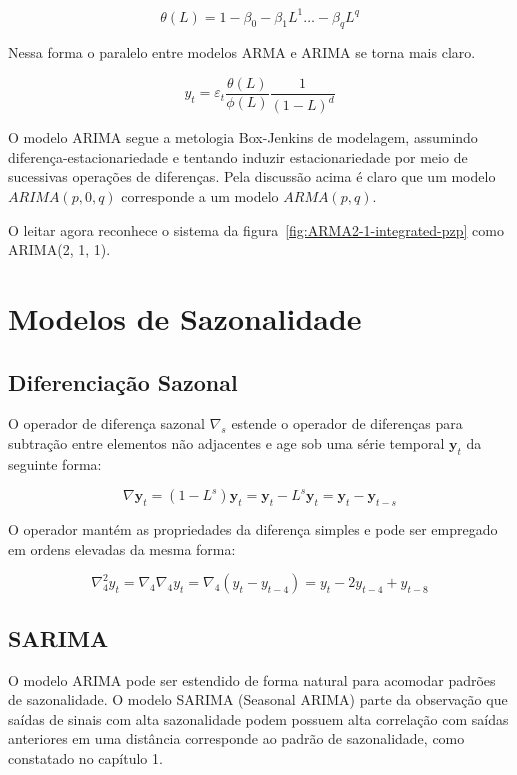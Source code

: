 $$\theta(L) = 1 - \beta_0 - \beta_1 L^1 \hdots - \beta_q L^q$$

Nessa forma o paralelo entre modelos ARMA e ARIMA se torna mais claro.

\begin{equation}\label{eq:arima_l}
    y_t = \varepsilon_t \frac{\theta(L)}{\phi(L)} \frac{1}{(1-L)^d}
\end{equation}

O modelo ARIMA segue a metologia Box-Jenkins de modelagem, assumindo
diferença-estacionariedade e tentando induzir estacionariedade por meio de
sucessivas operações de diferenças. Pela discussão acima é claro que um modelo
$ARIMA(p, 0, q)$ corresponde a um modelo $ARMA(p, q)$.

O leitar agora reconhece o sistema da figura~\ref{fig:ARMA2-1-integrated-pzp}
como ARIMA(2, 1, 1).

\section{Modelos de Sazonalidade}\label{sec:seasonality_models}

\subsection{Diferenciação Sazonal}

O operador de diferença sazonal $\nabla_s$ estende o operador de diferenças
para subtração entre elementos não adjacentes e age sob uma série temporal
$\mathbf{y}_t$ da seguinte forma:

$$ \nabla \mathbf{y}_t = (1 - L^s)\mathbf{y}_t = \mathbf{y}_t - L^s\mathbf{y}_t = \mathbf{y}_t - \mathbf{y}_{t-s} $$

O operador mantém as propriedades da diferença simples e pode ser empregado em
ordens elevadas da mesma forma:

$$\nabla_4^2 y_t = \nabla_4 \nabla_4 y_t = \nabla_4 (y_t - y_{t-4}) = y_t - 2y_{t-4} + y_{t-8} $$

\subsection{SARIMA}\label{ssec:SARIMA}

O modelo ARIMA pode ser estendido de forma natural para acomodar padrões de
sazonalidade. O modelo SARIMA (Seasonal ARIMA) parte da observação que saídas
de sinais com alta sazonalidade podem possuem alta correlação com saídas
anteriores em uma distância corresponde ao padrão de sazonalidade, como
constatado no capítulo 1.

